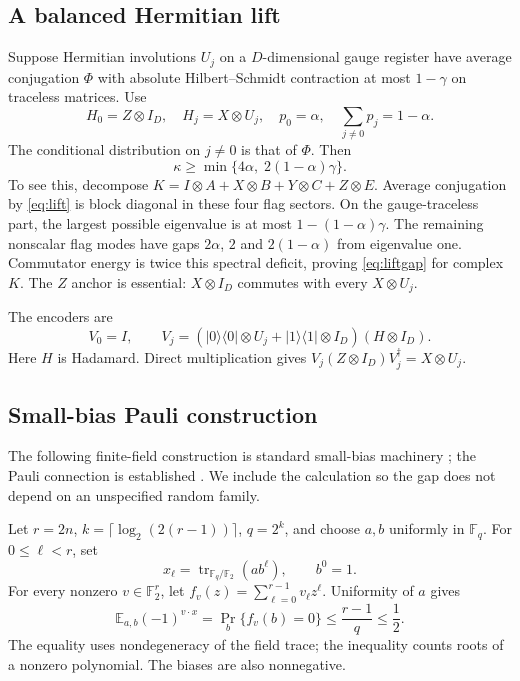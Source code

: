\documentclass[11pt]{article}
\begin{document}
\subsection{A balanced Hermitian lift}
Suppose Hermitian involutions $U_j$ on a $D$-dimensional gauge register have
average conjugation $\Phi$ with absolute Hilbert--Schmidt contraction at most
$1-\gamma$ on traceless matrices. Use
\begin{equation}
 H_0=Z\otimes I_D,\quad H_j=X\otimes U_j,\quad
 p_0=\alpha,\quad \sum_{j\ne0}p_j=1-\alpha. \label{eq:lift}
\end{equation}
The conditional distribution on $j\ne0$ is that of $\Phi$. Then
\begin{equation}
 \kappa\ge\min\{4\alpha,\;2(1-\alpha)\gamma\}. \label{eq:liftgap}
\end{equation}
To see this, decompose $K=I\otimes A+X\otimes B+Y\otimes C+Z\otimes E$.
Average conjugation by \eqref{eq:lift} is block diagonal in these four flag
sectors. On the gauge-traceless part, the largest possible eigenvalue is at
most $1-(1-\alpha)\gamma$. The remaining nonscalar flag modes have gaps
$2\alpha$, $2$ and $2(1-\alpha)$ from eigenvalue one. Commutator energy is
twice this spectral deficit, proving \eqref{eq:liftgap} for complex $K$.
The $Z$ anchor is essential: $X\otimes I_D$ commutes with every $X\otimes U_j$.

The encoders are
\begin{equation}
 V_0=I,\qquad V_j=\left(|0\rangle\langle0|\otimes U_j+
 |1\rangle\langle1|\otimes I_D\right)(H\otimes I_D). \label{eq:controlled}
\end{equation}
Here $H$ is Hadamard. Direct multiplication gives
$V_j(Z\otimes I_D)V_j^\dagger=X\otimes U_j$.

\subsection{Small-bias Pauli construction}
The following finite-field construction is standard small-bias machinery
\cite{aghp}; the Pauli connection is established \cite{as}. We include the
calculation so the gap does not depend on an unspecified random family.

Let $r=2n$, $k=\lceil\log_2(2(r-1))\rceil$, $q=2^k$, and choose $a,b$
uniformly in $\mathbb F_q$. For $0\le\ell<r$, set
\begin{equation}
 x_\ell=\operatorname{tr}_{\mathbb F_q/\mathbb F_2}(ab^\ell),\qquad b^0=1.
\end{equation}
For every nonzero $v\in\mathbb F_2^r$, let
$f_v(z)=\sum_{\ell=0}^{r-1}v_\ell z^\ell$. Uniformity of $a$ gives
\begin{equation}
 \mathbb E_{a,b}(-1)^{v\cdot x}
 =\Pr_b\{f_v(b)=0\}\le\frac{r-1}{q}\le\frac12. \label{eq:biasfield}
\end{equation}
The equality uses nondegeneracy of the field trace; the inequality counts
roots of a nonzero polynomial. The biases are also nonnegative.
\end{document}
